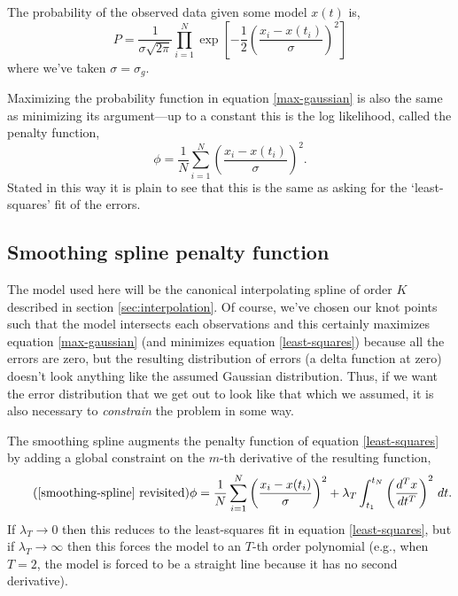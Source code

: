 \documentclass[10pt,journal]{IEEEtran}
\begin{document}
The probability of the observed data given some model $x(t)$ is,
\begin{equation}
\label{max-gaussian}
P = \frac{1}{\sigma \sqrt{2 \pi}} \prod_{i=1}^{N}  \exp \left[ -\frac{1}{2} \left( \frac{x_i - x(t_i)}{\sigma} \right)^2 \right]
\end{equation}
where we've taken $\sigma=\sigma_g$.

Maximizing the probability function in equation \ref{max-gaussian} is also the same as minimizing its argument---up to a constant this is the log likelihood, called the penalty function,
\begin{equation}
\label{least-squares}
\phi = \frac{1}{N}\sum_{i=1}^{N} \left( \frac{x_i - x(t_i)}{\sigma} \right)^2 .
\end{equation}
Stated in this way it is plain to see that this is the same as asking for the `least-squares' fit of the errors.


\subsection{Smoothing spline penalty function}

The model used here will be the canonical interpolating spline of order $K$ described in section \ref{sec:interpolation}. Of course, we've chosen our knot points such that the model intersects each observations and this certainly maximizes equation \ref{max-gaussian} (and minimizes equation \ref{least-squares}) because all the errors are zero, but the resulting distribution of errors (a delta function at zero) doesn't look anything like the assumed Gaussian distribution. Thus, if we want the error distribution that we get out to look like that which we assumed, it is also necessary to \emph{constrain} the problem in some way.

The smoothing spline augments the penalty function of equation \ref{least-squares} by adding a global constraint on the $m$-th derivative of the resulting function,
\begin{equation*}
\tag{\ref{smoothing-spline} revisited}
\phi =  \frac{1}{N}\sum_{i=1}^{N} \left( \frac{x_i - x(t_i)}{\sigma} \right) ^2 + \lambda_T \int_{t_1}^{t_N} \left(\frac{d^T x}{dt^T}\right)^2 \, dt.
\end{equation*}
If $\lambda_T \rightarrow 0$ then this reduces to the least-squares fit in equation \ref{least-squares}, but if $\lambda_T \rightarrow \infty$ then this forces the model to an $T$-th order polynomial (e.g., when $T=2$, the model is forced to be a straight line because it has no second derivative).
\end{document}
